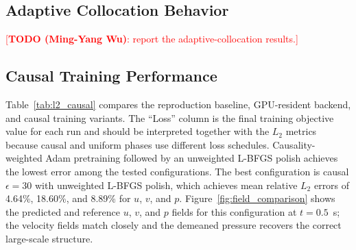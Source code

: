 \documentclass{article}
\begin{document}
\subsection{Adaptive Collocation Behavior}

\textcolor{red}{[\textbf{TODO (Ming-Yang Wu)}: report the adaptive-collocation results.]}

\subsection{Causal Training Performance}

Table~\ref{tab:l2_causal} compares the reproduction baseline, GPU-resident backend, and causal training variants. The ``Loss'' column is the final training objective value for each run and should be interpreted together with the $L_2$ metrics because causal and uniform phases use different loss schedules. Causality-weighted Adam pretraining followed by an unweighted L-BFGS polish achieves the lowest error among the tested configurations. The best configuration is causal $\epsilon=30$ with unweighted L-BFGS polish, which achieves mean relative $L_2$ errors of 4.64\%, 18.60\%, and 8.89\% for $u$, $v$, and $p$. Figure~\ref{fig:field_comparison} shows the predicted and reference $u$, $v$, and $p$ fields for this configuration at $t=0.5$~s; the velocity fields match closely and the demeaned pressure recovers the correct large-scale structure.

\begin{table}[h]
  \centering
  \caption{$Re=10$ post-initial-transient error ($t\geq0.1$~s). \emph{frozen} keeps causal weights during L-BFGS; \emph{uniform} switches back to the unweighted physical loss during L-BFGS.}
  \label{tab:l2_causal}
\end{table}
\end{document}
